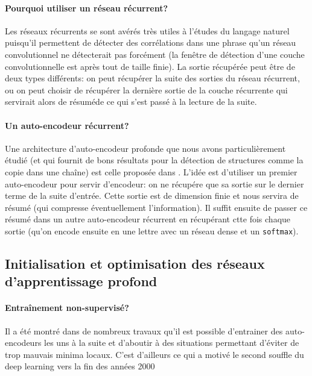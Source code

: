 \documentclass[a4paper,11pt]{article}
\begin{document}
\paragraph{Pourquoi utiliser un réseau récurrent?}

Les réseaux récurrents se sont avérés très utiles à l'études du langage naturel
puisqu'il permettent de détecter des corrélations dans une phrase qu'un réseau
convolutionnel ne détecterait pas forcément (la fenêtre de détection d'une
couche convolutionnelle est après tout de taille finie).  La sortie récupérée
peut être de deux types différents: on peut récupérer la suite des sorties du
réseau récurrent, ou on peut choisir de récupérer la dernière sortie de la
couche récurrente qui servirait alors de \og résumé\fg de ce qui s'est passé à
la lecture de la suite.

\paragraph{Un auto-encodeur récurrent?}

\begin{figure}
  
\end{figure}

Une architecture d'auto-encodeur profonde que nous avons particulièrement étudié
(et qui fournit de bons résultats pour la détection de structures comme la copie
dans une chaîne) est celle proposée dans \cite{DBLP:journals/corr/ChoMGBSB14}.
L'idée est d'utiliser un premier auto-encodeur pour servir d'encodeur: on ne
récupére que sa sortie sur le dernier terme de la suite d'entrée. Cette sortie
est de dimension finie et nous servira de résumé (qui compresse éventuellement
l'information). Il suffit ensuite de passer ce résumé dans un autre
auto-encodeur récurrent en récupérant ctte fois chaque sortie (qu'on encode
ensuite en une lettre avec un réseau dense et un \texttt{softmax}).

\subsection{Initialisation et optimisation des réseaux d'apprentissage profond}

\paragraph{Entraînement non-supervisé?}

Il a été montré dans de nombreux travaux qu'il est possible d'entrainer des
auto-encodeurs les uns à la suite et d'aboutir à des situations permettant
d'éviter de trop mauvais minima locaux. C'est d'ailleurs ce qui a motivé le
second souffle du deep learning vers la fin des années 2000
\end{document}

